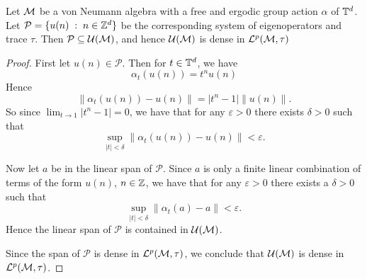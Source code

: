 \begin{proposition}
    Let $\mathcal{M}$ be a von Neumann algebra with a free and ergodic group action $\alpha$ of $\mathbb{T}^d$.
    Let $\mathcal{P} = \{u(n)\;:\;n \in \mathbb{Z}^d\}$ be the corresponding system
    of eigenoperators and trace $\tau$. Then $\mathcal{P} \subseteq \mathcal{U}(\mathcal{M})$,
    and hence $\mathcal{U}(\mathcal{M})$ is dense in $\mathcal{L}^p(\mathcal{M},\tau)$
\end{proposition}
\begin{proof}

    First let $u(n) \in \mathcal{P}$. Then for $t \in \mathbb{T}^d$,
    we have
    \begin{equation}
        \alpha_t(u(n)) = t^n u(n)
    \end{equation}
    Hence
    \begin{equation}
        \|\alpha_t(u(n))-u(n)\| = |t^n-1|\|u(n)\|.
    \end{equation}
    So since $\lim_{t\rightarrow 1} |t^n - 1| = 0$, we have 
    that for any $\varepsilon > 0$ there exists $\delta > 0$ such that
    \begin{equation}
        \sup_{|t| < \delta} \|\alpha_t(u(n))-u(n)\| < \varepsilon. 
    \end{equation} 
    
    Now let $a$ be in the linear span of $\mathcal{P}$. Since $a$
    is only a finite linear combination of terms of the form $u(n)$, $n \in \mathbb{Z}$, we have
    that for any $\varepsilon > 0$ there exists a $\delta > 0$ such that
    \begin{equation}
        \sup_{|t| <  \delta} \|\alpha_t(a) - a\| < \varepsilon.
    \end{equation}
    Hence the linear span of $\mathcal{P}$ is contained in $\mathcal{U}(\mathcal{M})$.
    
    Since the span of $\mathcal{P}$ is dense in $\mathcal{L}^p(\mathcal{M},\tau)$,
    we conclude that $\mathcal{U}(\mathcal{M})$ is dense in $\mathcal{L}^p(\mathcal{M},\tau)$.
\end{proof}


